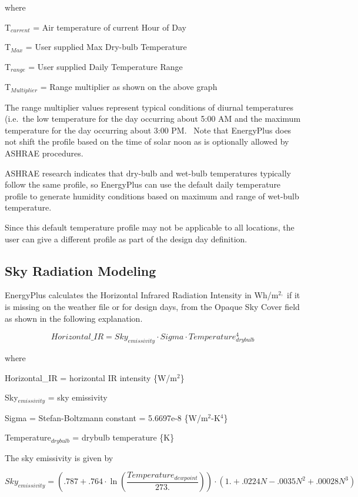 where

T\(_{current}\) = Air temperature of current Hour of Day

T\(_{Max}\) = User supplied Max Dry-bulb Temperature

T\(_{range}\) = User supplied Daily Temperature Range

T\(_{Multiplier}\) = Range multiplier as shown on the above graph

The range multiplier values represent typical conditions of diurnal temperatures (i.e.~the low temperature for the day occurring about 5:00 AM and the maximum temperature for the day occurring about 3:00 PM.~ Note that EnergyPlus does not shift the profile based on the time of solar noon as is optionally allowed by ASHRAE procedures.

ASHRAE research indicates that dry-bulb and wet-bulb temperatures typically follow the same profile, so EnergyPlus can use the default daily temperature profile to generate humidity conditions based on maximum and range of wet-bulb temperature.

Since this default temperature profile may not be applicable to all locations, the user can give a different profile as part of the design day definition.

\subsection{Sky Radiation Modeling}\label{sky-radiation-modeling}

EnergyPlus calculates the Horizontal Infrared Radiation Intensity in Wh/m\(^{2,}\) if it is missing on the weather file or for design days, from the Opaque Sky Cover field as shown in the following explanation.

\begin{equation}
Horizontal\_IR = Sk{y_{emissivity}}\cdot Sigma\cdot Temperature_{drybulb}^4
\end{equation}

where

Horizontal\_IR = horizontal IR intensity \{W/m\(^{2}\)\}

Sky\(_{emissivity}\) = sky emissivity

Sigma = Stefan-Boltzmann constant = 5.6697e-8 \{W/m\(^{2}\)-K\(^{4}\)\}

Temperature\(_{drybulb}\) = drybulb temperature \{K\}

The sky emissivity is given by

\begin{equation}
Sk{y_{emissivity}} = \left( {.787 + .764\cdot \ln \left( {\frac{{Temperatur{e_{dewpoint}}}}{{273.}}} \right)} \right)\cdot \left( {1. + .0224N - .0035{N^2} + .00028{N^3}} \right)
\end{equation}


